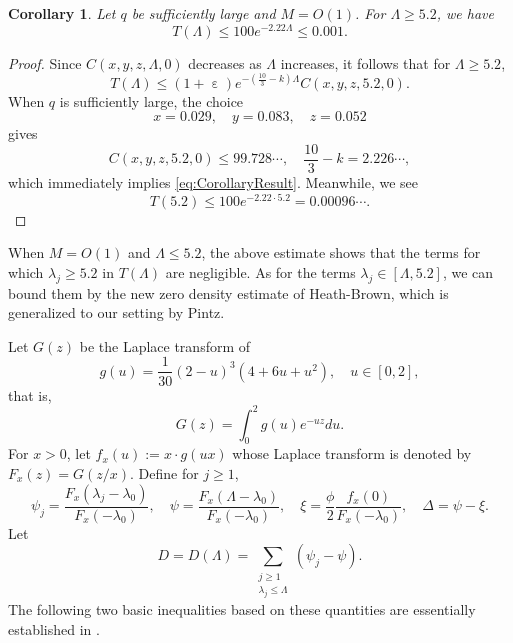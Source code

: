 \documentclass[10pt, reqno]{amsart}
\numberwithin{equation}{section}
\newtheorem{corollary}[theorem]{Corollary}
\renewcommand{\epsilon }{\operatorname{\varepsilon}}
\begin{document}
\begin{corollary}\label{cor:1}
Let $q$ be sufficiently large and $M=O(1)$. For $\Lambda\geq 5.2$, we have
\begin{equation}\label{eq:CorollaryResult}
T(\Lambda)\leq 100 e^{-2.22\Lambda}\leq 0.001.
\end{equation}
\end{corollary}

\begin{proof}
Since $C(x,y,z,\Lambda,0)$ decreases as $\Lambda$ increases, it follows that for $\Lambda\geq 5.2$,
\begin{equation}\label{eq:TLambda}
T(\Lambda)\leq (1+\epsilon)e^{-(\frac{10}{3}-k)\Lambda} C(x,y,z,5.2,0).
\end{equation}
When $q$ is sufficiently large, the choice
\begin{equation}\label{eq:Choice}
x = 0.029,\quad y = 0.083,\quad z = 0.052
\end{equation}
gives
\begin{equation}\label{eq:Values}
C(x,y,z,5.2,0)\leq 99.728\cdots,\quad \frac{10}{3}-k= 2.226\cdots,
\end{equation}
which immediately implies \eqref{eq:CorollaryResult}. Meanwhile, we see
\begin{equation}\label{eq:T52}
T(5.2)\leq 100e^{-2.22\cdot 5.2}=0.00096\cdots.
\end{equation}
\end{proof}

When $M=O(1)$ and $\Lambda\leq 5.2$, the above estimate shows that the terms for which $\lambda_j\geq 5.2$ in $T(\Lambda)$ are negligible. As for the terms $\lambda_j\in [\Lambda, 5.2]$, we can bound them by the new zero density estimate of Heath-Brown, which is generalized to our setting by Pintz.

Let $G(z)$ be the Laplace transform of
\begin{equation}\label{eq:gFunction}
g(u)=\frac{1}{30}(2-u)^3(4+6u+u^2),\quad u\in [0,2],
\end{equation}
that is,
\begin{equation}\label{eq:G}
G(z)=\int_0^2g(u)e^{-uz}du.
\end{equation}
For $x>0$, let $f_x(u):=x\cdot g(ux)$ whose Laplace transform is denoted by $F_x(z)=G(z/x)$. Define for $j\geq 1$,
$$\psi_{j}=\frac{F_x(\lambda_{j}-\lambda_{0})}{F_x(-\lambda_{0})}, \quad \psi=\frac{F_x(\Lambda-\lambda_{0})}{F_x(-\lambda_{0})},\quad \xi=\frac{\phi}{2}\frac{f_x(0)}{F_x(-\lambda_{0})},\quad \Delta=\psi-\xi.$$
Let
\begin{equation}\label{eq:D}
D=D(\Lambda)=\sum_{\substack{j\geq 1\\ \lambda_j\leq \Lambda}} (\psi_{j}-\psi).
\end{equation}
The following two basic inequalities based on these quantities are essentially established in  \cite{Pintz2018}.
\end{document}
